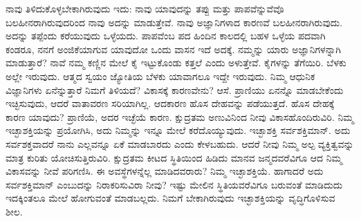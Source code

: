 ನಾವು ತಿಳಿದುಕೊಳ್ಳಬೇಕಾಗಿರುವುದು ಇದು: ನಾವು ಯಾವುದನ್ನು ತಪ್ಪು ಮತ್ತು ಪಾಪವೆನ್ನುವೆವೊ ಬಲಹೀನರಾಗಿರುವುದರಿಂದ ನಾವು ಅದನ್ನು ಮಾಡುತ್ತೇವೆ. ನಾವು ಅಜ್ಞಾನಿ\break ಗಳಾದ ಕಾರಣವೆ ಬಲಹೀನರಾಗಿರುವುದು. ಅದನ್ನು ತಪ್ಪೆಂದು ಕರೆಯುವುದು ಒಳ್ಳೆಯದು. ಪಾಪವೆಂಬ ಪದ ಹಿಂದಿನ ಕಾಲದಲ್ಲಿ ಬಹಳ ಒಳ್ಳೆಯ ಪದವಾಗಿ ಕಂಡರೂ, ನನಗೆ ಅಂಜಿಕೆಯಾಗುವ ಯಾವುದೋ ಒಂದು ವಾಸನ ಇದೆ ಅದಕ್ಕೆ. ನಮ್ಮನ್ನು ಯಾರು ಅಜ್ಞಾನಿಗಳನ್ನಾಗಿ ಮಾಡುತ್ತಾರೆ? ನಾವೆ ನಮ್ಮ ಕಣ್ಣಿನ ಮೇಲೆ ಕೈ ಇಟ್ಟುಕೊಂಡು ಕತ್ತಲೆ ಎಂದು ಅಳುತ್ತೇವೆ. ಕೈಗಳನ್ನು ತೆಗೆಯಿರಿ. ಬೆಳಕು ಅಲ್ಲೇ ಇರುವುದು. ಆತ್ಮದ ಸ್ವಯಂ ಜ್ಯೋತಿಯ ಬೆಳಕು ಯಾವಾಗಲೂ ಇದ್ದೇ ಇರುವುದು. ನಿಮ್ಮ ಆಧುನಿಕ ವಿಜ್ಞಾನಿಗಳು ಏನೆನ್ನುತ್ತಾರೆ ನಿಮಗೆ ತಿಳಿಯದೆ? ವಿಕಾಸಕ್ಕೆ ಕಾರಣವೇನು? ಆಸೆ. ಪ್ರಾಣಿಯು ಏನನ್ನೊ ಮಾಡಬೇಕೆಂದು ಇಚ್ಛಿಸುವುದು, ಆದರೆ ವಾತಾವರಣ ಸರಿಯಾಗಿಲ್ಲ. ಆದಕಾರಣ ಹೊಸ ದೇಹವನ್ನು ಪಡೆಯುತ್ತದೆ. ಹೊಸ ದೇಹಕ್ಕೆ ಕಾರಣ ಯಾವುದು? ಪ್ರಾಣಿಯೆ, ಅದರ ಇಚ್ಛೆಯೆ ಕಾರಣ. ಕ್ಷುದ್ರತಮ ಅಣುವಿನಿಂದ ನೀವು ವಿಕಾಸಹೊಂದಿರುವಿರಿ. ನಿಮ್ಮ ಇಚ್ಛಾಶಕ್ತಿಯನ್ನು ಪ್ರಯೋಗಿಸಿ, ಅದು ನಿಮ್ಮನ್ನು ಇನ್ನೂ ಮೇಲೆ ಕರೆದೊಯ್ಯುವುದು. ಇಚ್ಛಾಶಕ್ತಿ ಸರ್ವಶಕ್ತಿಮಾನ್​. ಅದು ಸರ್ವಶಕ್ತವಾದರೆ ನಾನು ಎಲ್ಲವನ್ನೂ ಏಕೆ ಮಾಡಬಾರದು ಎಂದು ಕೇಳಬಹುದು. ಆದರೆ ನೀವು ನಿಮ್ಮ ಅಲ್ಪ ವ್ಯಕ್ತಿತ್ವವನ್ನು ಮಾತ್ರ ಕುರಿತು ಯೋಚಿಸುತ್ತಿರುವಿರಿ. ಕ್ಷುದ್ರತಮ ಕೀಟದ ಸ್ಥಿತಿಯಿಂದ ಹಿಡಿದು ಮಾನವ ಜನ್ಮದವರೆವಿಗೂ ಆದ ನಿಮ್ಮ ವಿಕಾಸವನ್ನು ನೀವೆ ಪರಿಗಣಿಸಿ. ಈ ಅವಸ್ಥೆಗಳನ್ನೆಲ್ಲ ಮಾಡಿದವರಾರು? ನಿಮ್ಮ ಇಚ್ಛಾಶಕ್ತಿಯೆ. ಹಾಗಾದರೆ ಅದು ಸರ್ವಶಕ್ತಿಮಾನ್​ ಎಂಬುದನ್ನು ನಿರಾಕರಿಸುವಿರಾ ನೀವು? ಇಷ್ಟು ಮೇಲಿನ ಸ್ಥಿತಿಯವರೆವಿಗೂ ಬರುವಂತೆ ಮಾಡಿದುದು ಇದಕ್ಕಿಂತಲೂ ಮೇಲೆ ಹೋಗುವಂತೆ ಮಾಡಬಲ್ಲದು. ನಿಮಗೆ ಬೇಕಾಗಿರುವುದು ಇಚ್ಛಾಶಕ್ತಿಯನ್ನು ವೃದ್ಧಿಗೊಳಿಸುವ ಶೀಲ. 

\vskip 8pt


